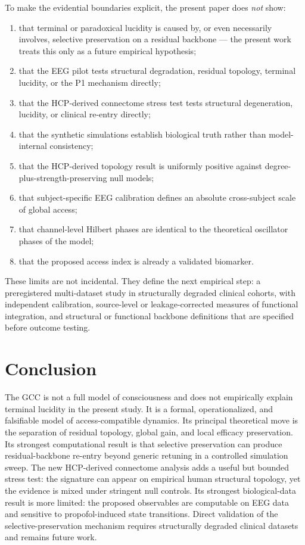 \documentclass[11pt,a4paper]{article}
\theoremstyle{plain}
\theoremstyle{definition}
\theoremstyle{remark}
\begin{document}
To make the evidential boundaries explicit, the present paper does \emph{not} show:
\begin{enumerate}
\item that terminal or paradoxical lucidity is caused by, or even necessarily involves, selective preservation on a residual backbone --- the present work treats this only as a future empirical hypothesis;
\item that the EEG pilot tests structural degradation, residual topology, terminal lucidity, or the P1 mechanism directly;
\item that the HCP-derived connectome stress test tests structural degeneration, lucidity, or clinical re-entry directly;
\item that the synthetic simulations establish biological truth rather than model-internal consistency;
\item that the HCP-derived topology result is uniformly positive against degree-plus-strength-preserving null models;
\item that subject-specific EEG calibration defines an absolute cross-subject scale of global access;
\item that channel-level Hilbert phases are identical to the theoretical oscillator phases of the model;
\item that the proposed access index is already a validated biomarker.
\end{enumerate}

These limits are not incidental. They define the next empirical step: a preregistered multi-dataset study in structurally degraded clinical cohorts, with independent calibration, source-level or leakage-corrected measures of functional integration, and structural or functional backbone definitions that are specified before outcome testing.

\section{Conclusion}
\label{sec:schluss}

The GCC is not a full model of consciousness and does not empirically explain terminal lucidity in the present study. It is a formal, operationalized, and falsifiable model of access-compatible dynamics. Its principal theoretical move is the separation of residual topology, global gain, and local efficacy preservation. Its strongest computational result is that selective preservation can produce residual-backbone re-entry beyond generic retuning in a controlled simulation sweep. The new HCP-derived connectome analysis adds a useful but bounded stress test: the signature can appear on empirical human structural topology, yet the evidence is mixed under stringent null controls. Its strongest biological-data result is more limited: the proposed observables are computable on EEG data and sensitive to propofol-induced state transitions. Direct validation of the selective-preservation mechanism requires structurally degraded clinical datasets and remains future work.
\end{document}
